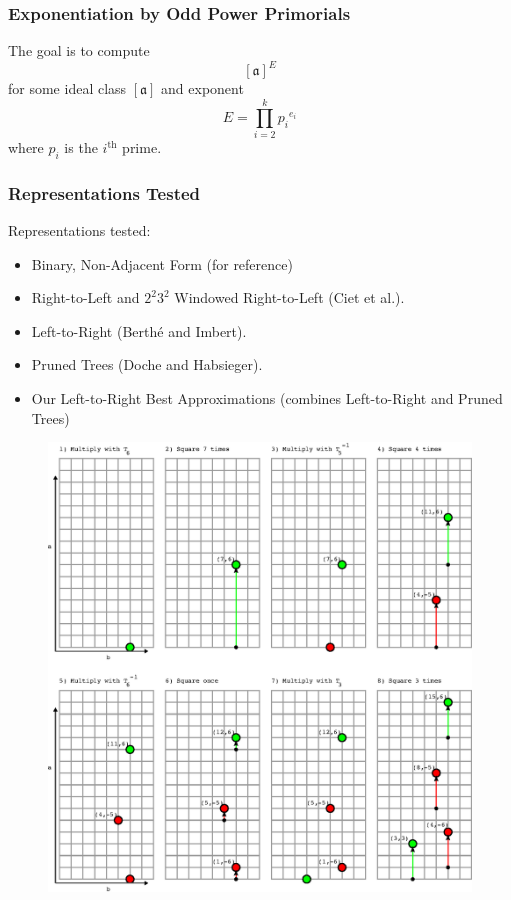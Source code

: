 \documentclass{beamer}
\newcommand{\ideal}{\mathfrak}
\newcommand{\idealclass}[1]{\left[ \ideal #1 \right]}
\newcommand{\aclass}{\idealclass a}
\newcommand{\ith}{i^{\textrm{th}}}
\begin{document}
\begin{frame}
\frametitle{Exponentiation by Odd Power Primorials}
The goal is to compute
\[
\aclass ^ E
\]
for some ideal class $\aclass$ and exponent
\[
	E = \prod_{i=2}^k {p_i}^{e_i}
\]
where $p_i$ is the $\ith$ prime.
\end{frame}


\begin{frame}
\frametitle{Representations Tested}
Representations tested:
\begin{itemize}
\item Binary, Non-Adjacent Form (for reference)
\item Right-to-Left and $2^2 3^2$ Windowed Right-to-Left (Ciet et al.).
\item Left-to-Right (Berth{\'e} and Imbert).
\item Pruned Trees (Doche and Habsieger).
\item Our Left-to-Right Best Approximations \break (combines Left-to-Right and Pruned Trees)
\end{itemize}
\end{frame}

\begin{frame}
\begin{figure}
\includegraphics[scale=0.46]{yao1}
\end{figure}
\end{frame}
\end{document}
